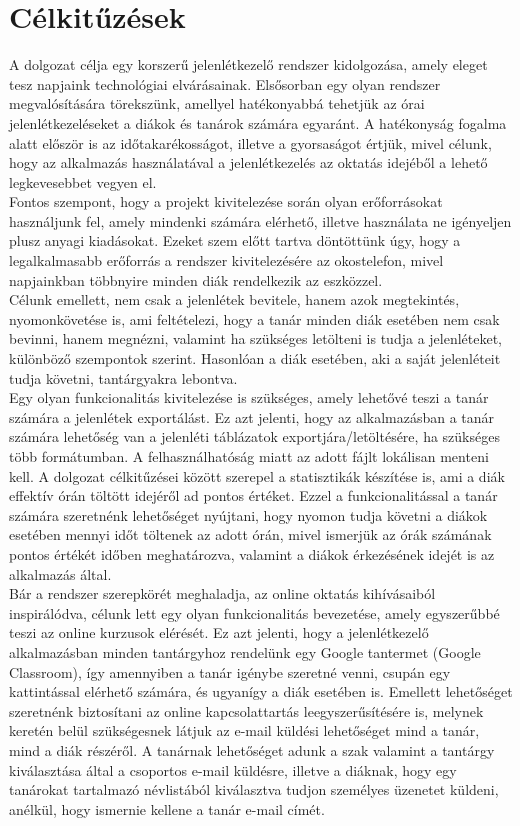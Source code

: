 \documentclass[12pt]{article}
\numberwithin{figure}{section}
\numberwithin{equation}{section}
\begin{document}
\section{Célkitűzések}
A dolgozat célja egy korszerű jelenlétkezelő rendszer kidolgozása, amely eleget tesz napjaink technológiai elvárásainak. Elsősorban egy olyan rendszer megvalósítására törekszünk, amellyel hatékonyabbá tehetjük az órai jelenlétkezeléseket a diákok és tanárok számára egyaránt. A hatékonyság fogalma alatt először is az időtakarékosságot, illetve a gyorsaságot értjük, mivel célunk, hogy az alkalmazás használatával a jelenlétkezelés az oktatás idejéből a lehető legkevesebbet vegyen el.\\
Fontos szempont, hogy a projekt kivitelezése során olyan erőforrásokat használjunk fel, amely mindenki számára elérhető, illetve használata ne igényeljen plusz anyagi kiadásokat. Ezeket szem előtt tartva döntöttünk úgy, hogy a legalkalmasabb erőforrás a rendszer kivitelezésére az okostelefon, mivel napjainkban többnyire minden diák rendelkezik az eszközzel.\\
Célunk emellett, nem csak a jelenlétek bevitele, hanem azok megtekintés, nyomonkövetése is, ami feltételezi, hogy a tanár minden diák esetében nem csak bevinni, hanem megnézni, valamint ha szükséges letölteni is tudja a jelenléteket, különböző szempontok szerint. Hasonlóan a diák esetében, aki a saját jelenléteit tudja követni, tantárgyakra lebontva.\\ 
Egy olyan funkcionalitás kivitelezése is szükséges, amely lehetővé teszi a tanár számára a jelenlétek exportálást. Ez azt jelenti, hogy az alkalmazásban a tanár számára lehetőség van a jelenléti táblázatok exportjára/letöltésére, ha szükséges több formátumban. A felhasználhatóság miatt az adott fájlt lokálisan menteni kell. 
A dolgozat célkitűzései között szerepel a statisztikák készítése is, ami a diák effektív órán töltött idejéről ad pontos értéket. Ezzel a funkcionalitással a tanár számára szeretnénk lehetőséget nyújtani, hogy nyomon tudja követni a diákok esetében mennyi időt töltenek az adott órán, mivel ismerjük az órák számának pontos értékét időben meghatározva, valamint a diákok érkezésének idejét is az alkalmazás által.\\
Bár a rendszer szerepkörét meghaladja, az online oktatás kihívásaiból inspirálódva, célunk lett egy olyan funkcionalitás bevezetése, amely egyszerűbbé teszi az online kurzusok elérését. Ez azt jelenti, hogy a jelenlétkezelő alkalmazásban minden tantárgyhoz rendelünk egy Google tantermet (Google Classroom), így amennyiben a tanár igénybe szeretné venni, csupán egy kattintással elérhető számára, és ugyanígy a diák esetében is. Emellett lehetőséget szeretnénk biztosítani az online kapcsolattartás leegyszerűsítésére is, melynek keretén belül szükségesnek látjuk az e-mail küldési lehetőséget mind a tanár, mind a diák részéről. A tanárnak lehetőséget adunk a szak valamint a tantárgy kiválasztása által a csoportos e-mail küldésre, illetve a diáknak, hogy egy tanárokat tartalmazó névlistából kiválasztva tudjon személyes üzenetet küldeni, anélkül, hogy ismernie kellene a tanár e-mail címét.\\
\end{document}
